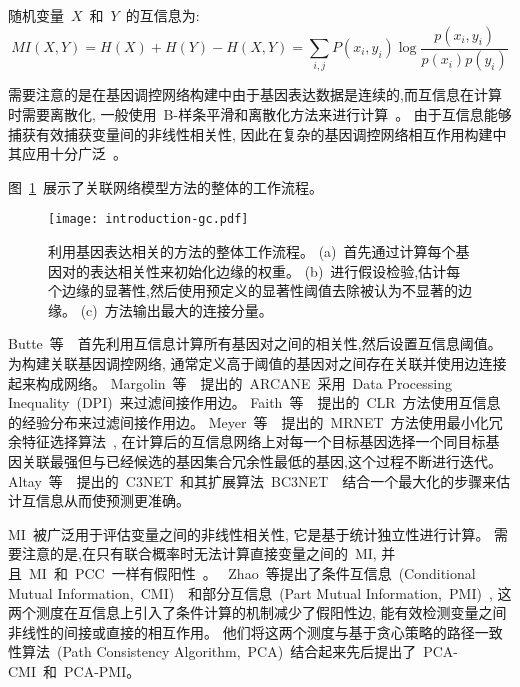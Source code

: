 随机变量~$X$~和~$Y$~的互信息为:
\begin{equation}
MI(X,Y) = H(X) + H(Y) - H(X,Y) = \sum\limits_{i,j} {P(x_i ,y_i )\log \frac{{p(x_i,y_i )}}{{p(x_i )p(y_i )}}} 
\end{equation}

需要注意的是在基因调控网络构建中由于基因表达数据是连续的,而互信息在计算时需要离散化,
一般使用~B-样条平滑和离散化方法来进行计算~\cite{daub2004estimating}。
由于互信息能够捕获有效捕获变量间的非线性相关性,
因此在复杂的基因调控网络相互作用构建中其应用十分广泛~\cite{brunel2010miss,zhang2011inferring}。

图~\ref{fig:pre-gc}~展示了关联网络模型方法的整体的工作流程。
\begin{figure}[!htbp]
    \centering
    \texttt{[image: introduction-gc.pdf]}
    \caption{
        利用基因表达相关的方法的整体工作流程。
        (a)~首先通过计算每个基因对的表达相关性来初始化边缘的权重。
        (b)~进行假设检验,估计每个边缘的显著性,然后使用预定义的显著性阈值去除被认为不显著的边缘。
        (c)~方法输出最大的连接分量。
    }
    \label{fig:pre-gc}
\end{figure}


Butte~等~\cite{basso2005reverse}~首先利用互信息计算所有基因对之间的相关性,然后设置互信息阈值。
为构建关联基因调控网络, 通常定义高于阈值的基因对之间存在关联并使用边连接起来构成网络。
Margolin~等~\cite{margolin2006aracne}~提出的~ARCANE~采用~Data Processing Inequality~(DPI)~来过滤间接作用边。
Faith~等~\cite{faith2007large}~提出的~CLR~方法使用互信息的经验分布来过滤间接作用边。
Meyer~等~\cite{meyer2007information}~提出的~MRNET~方法使用最小化冗余特征选择算法~\cite{peng2005feature},
在计算后的互信息网络上对每一个目标基因选择一个同目标基因关联最强但与已经候选的基因集合冗余性最低的基因,这个过程不断进行迭代。
Altay~等~\cite{altay2010inferring}~提出的~C3NET~和其扩展算法~BC3NET~\cite{de2012bagging}~结合一个最大化的步骤来估计互信息从而使预测更准确。

MI~被广泛用于评估变量之间的非线性相关性,
它是基于统计独立性进行计算。
需要注意的是,在只有联合概率时无法计算直接变量之间的~MI,
并且~MI~和~PCC~一样有假阳性~\cite{frenzel2007partial,schreiber2000measuring}。
~Zhao~等提出了条件互信息~(Conditional Mutual Information,~CMI)~\cite{zhang2011inferring}~和部分互信息~(Part Mutual Information,~PMI)~\cite{zhao2016part},
这两个测度在互信息上引入了条件计算的机制减少了假阳性边,
能有效检测变量之间非线性的间接或直接的相互作用。
他们将这两个测度与基于贪心策略的路径一致性算法~(Path Consistency Algorithm,~PCA)~结合起来先后提出了~PCA-CMI\cite{zhang2011inferring}~和~PCA-PMI\cite{zhao2016part}。

